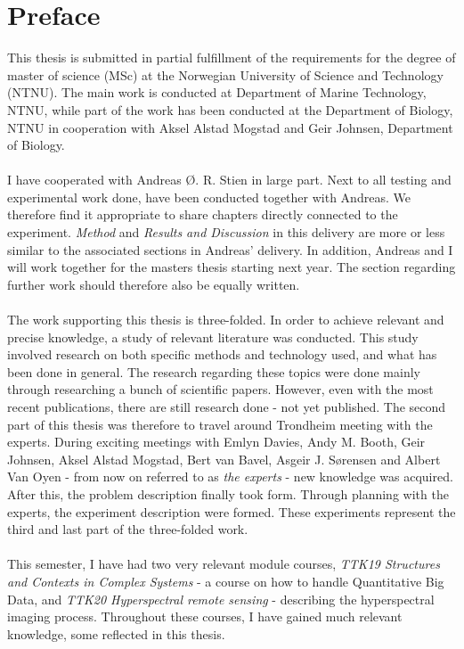 \hypersetup{pageanchor=true}
%
\chapter*{Preface}
This thesis is submitted in partial fulfillment of the requirements for the degree of master of science (MSc) at the Norwegian University of Science and Technology (NTNU). The main work is conducted at Department of Marine Technology, NTNU, while part of the work has been conducted at the Department of Biology, NTNU in cooperation with Aksel Alstad Mogstad and Geir Johnsen, Department of Biology. 
\\\\
I have cooperated with Andreas {\O}. R. Stien in large part. Next to all testing and experimental work done, have been conducted together with Andreas. We therefore find it appropriate to share chapters directly connected to the experiment. \textit{Method} and \textit{Results and Discussion} in this delivery are more or less similar to the associated sections in Andreas’ delivery. In addition, Andreas and I will work together for the masters thesis starting next year. The section regarding further work should therefore also be equally written. 
\\\\
The work supporting this thesis is three-folded. In order to achieve relevant and precise knowledge, a study of relevant literature was conducted. This study involved research on both specific methods and technology used, and what has been done in general. The research regarding these topics were done mainly through researching a bunch of scientific papers. However, even with the most recent publications, there are still research done - not yet published. The second part of this thesis was therefore to travel around Trondheim meeting with the experts. During exciting meetings with Emlyn Davies, Andy M. Booth, Geir Johnsen, Aksel Alstad Mogstad, Bert van Bavel, Asgeir J. S{\o}rensen and Albert Van Oyen - from now on referred to as \textit{the experts} - new knowledge was acquired. After this, the problem description finally took form. Through planning with the experts, the experiment description were formed. These experiments represent the third and last part of the three-folded work. 
\\\\
This semester, I have had two very relevant module courses, \textit{TTK19 Structures and Contexts in Complex Systems} -  a course on how to handle Quantitative Big Data, and \textit{TTK20 Hyperspectral remote sensing} - describing the hyperspectral imaging process. Throughout these courses, I have gained much relevant knowledge, some reflected in this thesis.


